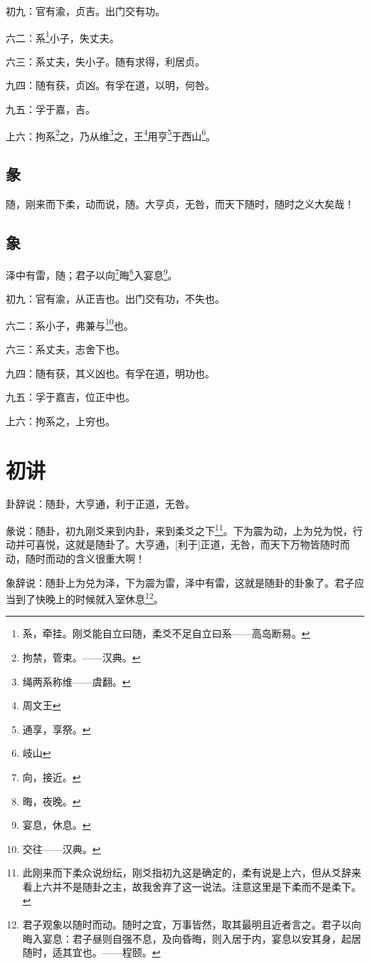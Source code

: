 \documentclass[12pt,oneside]{book}
\begin{document}
初九：官有渝，贞吉。出门交有功。

六二：系\footnote{系，牵挂。刚爻能自立曰随，柔爻不足自立曰系——高岛断易。}小子，失丈夫。

六三：系丈夫，失小子。随有求得，利居贞。

九四：随有获，贞凶。有孚在道，以明，何咎。

九五：孚于嘉，吉。

上六：拘系\footnote{拘禁，管束。——汉典。}之，乃从维\footnote{绳两系称维——虞翻。}之，王\footnote{周文王}用亨\footnote{通享，享祭。}于西山\footnote{岐山}。

\subsection{彖}
随，刚来而下柔，动而说，随。大亨贞，无咎，而天下随时，随时之义大矣哉！

\subsection{象}
泽中有雷，随；君子以向\footnote{向，接近。}晦\footnote{晦，夜晚。}入宴息\footnote{宴息，休息。}。

初九：官有渝，从正吉也。出门交有功，不失也。

六二：系小子，弗兼与\footnote{交往——汉典。}也。

六三：系丈夫，志舍下也。

九四：随有获，其义凶也。有孚在道，明功也。

九五：孚于嘉吉，位正中也。

上六：拘系之，上穷也。


\section{初讲}
卦辞说：随卦，大亨通，利于正道，无咎。

彖说：随卦，初九刚爻来到内卦，来到柔爻之下\footnote{此刚来而下柔众说纷纭，刚爻指初九这是确定的，柔有说是上六，但从爻辞来看上六并不是随卦之主，故我舍弃了这一说法。注意这里是下柔而不是柔下。}。下为震为动，上为兑为悦，行动并可喜悦，这就是随卦了。大亨通，[利于]正道，无咎，而天下万物皆随时而动，随时而动的含义很重大啊！

象辞说：随卦上为兑为泽，下为震为雷，泽中有雷，这就是随卦的卦象了。君子应当到了快晚上的时候就入室休息\footnote{君子观象以随时而动。随时之宜，万事皆然，取其最明且近者言之。君子以向晦入宴息：君子昼则自强不息，及向昏晦，则入居于内，宴息以安其身，起居随时，适其宜也。——程颐。}。
\end{document}
